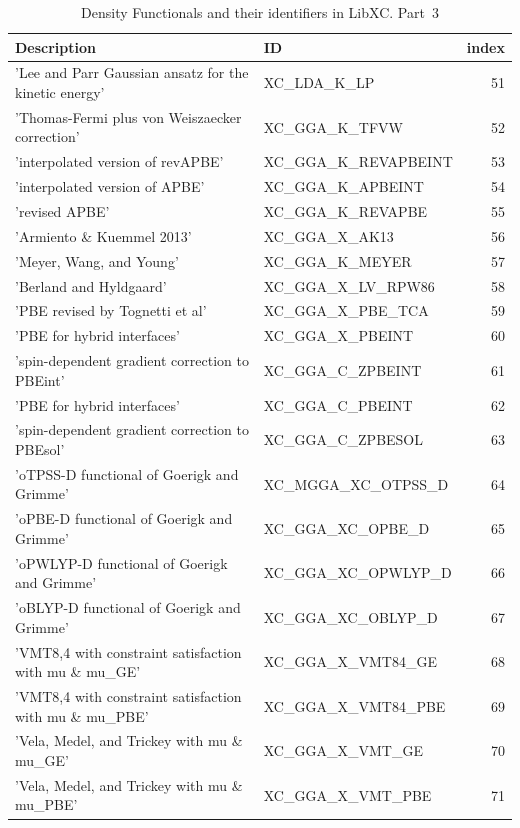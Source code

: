 \documentclass[final,12pt,makeidx,DIV=calc]{article}
\begin{document}
{{{\begin{table}[!h]
\caption{Density Functionals and their identifiers in LibXC. Part~3}
\begin{center}
\begin{tabular}{llr}
\hline
\hline
Description & ID & index\\
\hline
  'Lee and Parr Gaussian ansatz for the kinetic energy' & XC\_LDA\_K\_LP  & 51\\
  'Thomas-Fermi plus von Weiszaecker correction' & XC\_GGA\_K\_TFVW  & 52\\
  'interpolated version of revAPBE' & XC\_GGA\_K\_REVAPBEINT  & 53\\
  'interpolated version of APBE' & XC\_GGA\_K\_APBEINT  & 54\\
  'revised APBE' & XC\_GGA\_K\_REVAPBE  & 55\\
  'Armiento \& Kuemmel 2013' & XC\_GGA\_X\_AK13  & 56\\
  'Meyer,  Wang, and Young' & XC\_GGA\_K\_MEYER  & 57\\
  'Berland and Hyldgaard' & XC\_GGA\_X\_LV\_RPW86  & 58\\
  'PBE revised by Tognetti et al' & XC\_GGA\_X\_PBE\_TCA  & 59\\
  'PBE for hybrid interfaces' & XC\_GGA\_X\_PBEINT  & 60\\
  'spin-dependent gradient correction to PBEint' & XC\_GGA\_C\_ZPBEINT  & 61\\
  'PBE for hybrid interfaces' & XC\_GGA\_C\_PBEINT  & 62\\
  'spin-dependent gradient correction to PBEsol' & XC\_GGA\_C\_ZPBESOL  & 63\\
  'oTPSS-D functional of Goerigk and Grimme' & XC\_MGGA\_XC\_OTPSS\_D  & 64\\
  'oPBE-D functional of Goerigk and Grimme' & XC\_GGA\_XC\_OPBE\_D  & 65\\
  'oPWLYP-D functional of Goerigk and Grimme' & XC\_GGA\_XC\_OPWLYP\_D  & 66\\
  'oBLYP-D functional of Goerigk and Grimme' & XC\_GGA\_XC\_OBLYP\_D  & 67\\
  'VMT{8,4} with constraint satisfaction with mu \& mu\_GE' & XC\_GGA\_X\_VMT84\_GE  & 68\\
  'VMT{8,4} with constraint satisfaction with mu \& mu\_PBE' & XC\_GGA\_X\_VMT84\_PBE  & 69\\
  'Vela, Medel, and Trickey with mu \& mu\_GE' & XC\_GGA\_X\_VMT\_GE  & 70\\
  'Vela, Medel, and Trickey with mu \& mu\_PBE' & XC\_GGA\_X\_VMT\_PBE  & 71\\

\end{tabular}
\end{center}
\end{table}}}}
\end{document}
